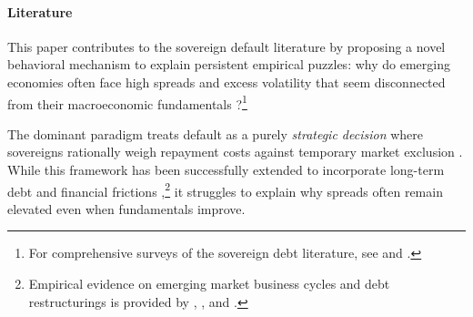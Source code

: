 \documentclass[12pt]{article}
\theoremstyle{plain}
\begin{document}
\paragraph{Literature} This paper contributes to the sovereign default literature by proposing a novel
behavioral mechanism to explain persistent empirical puzzles: why do emerging
economies often face high spreads and excess volatility that seem disconnected
from their macroeconomic fundamentals \citet{TomzWright2013,
	MitchenerTrebesch2023}?\footnote{For comprehensive surveys of the sovereign
	debt literature, see \citet{MeyerReinhartTrebesch2022} and \citet{Abbas2019}.}

The dominant paradigm treats default as a purely \textit{strategic decision}
where sovereigns rationally weigh repayment costs against temporary market
exclusion \citet{EatonGersovitz1981, AguiarGopinath2007, Arellano2008}. While
this framework has been successfully extended to incorporate long-term debt and
financial frictions \citet{HatchondoMartinez2009, ChatterjeeEyigungor2012,
	MendozaYue2012},\footnote{Empirical evidence on emerging market business cycles
	and debt restructurings is provided by \citet{NeumeyerPerri2005},
	\citet{CrucesTrebesch2013}, and \citet{ArellanoRamanarayanan2012}.} it
struggles to explain why spreads often remain elevated even when fundamentals
improve.
\end{document}

